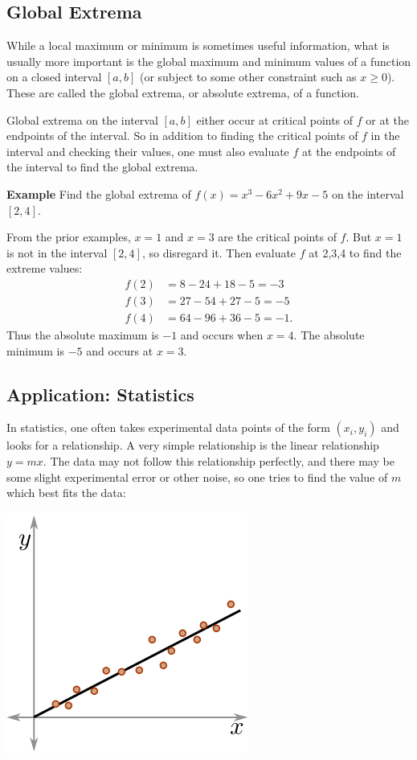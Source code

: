 \documentclass[twoside,openright,titlepage,a4paper]{book}
\begin{document}
\begin{sloppypar}
\subsection{Global Extrema}				

While a local maximum or minimum is sometimes useful information, what is usually more important is the global maximum and minimum values of a function on a closed interval $\left[a,b\right]$ (or subject to some other constraint such as $x \geq 0$). These are called the global extrema, or absolute extrema, of a function.

Global extrema on the interval $\left[a,b\right]$ either occur at critical points of $f$ or at the endpoints of the interval. So in addition to finding the critical points of $f$ in the interval and checking their values, one must also evaluate $f$ at the endpoints of the interval to find the global extrema.

\textbf{Example} Find the global extrema of $f(x) = x^3 - 6x^2+9x-5$ on the interval $\left[2,4\right]$.
\begin{examplebox}
From the prior examples, $x=1$ and $x=3$ are the critical points of $f$. But $x=1$ is not in the interval $\left[2,4\right]$, so disregard it. Then evaluate $f$ at 2,3,4 to find the extreme values:
\begin{align*}
f(2)&=8-24+18-5=-3 \\
f(3) &= 27-54+27-5=-5 \\
f(4) &= 64-96+36-5 = -1.
\end{align*}
Thus the absolute maximum is $-1$ and occurs when $x=4$. The absolute minimum is $-5$ and occurs at $x=3$.	
\end{examplebox}

\subsection{Application: Statistics}

In statistics, one often takes experimental data points of the form $(x_i,y_i)$ and looks for a relationship. A very simple relationship is the linear relationship $y = mx$. The data may not follow this relationship perfectly, and there may be some slight experimental error or other noise, so one tries to find the value of $m$ which best fits the data:
\begin{center}\includegraphics[scale=0.6]{DataPlot}\end{center}


\end{sloppypar}
\end{document}
